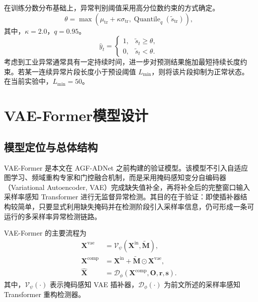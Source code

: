 \documentclass[bachelor, vlined]{DissertUESTC}
\begin{document}
    在训练分数分布基础上，异常判别阈值采用高分位数约束的方式确定。
    \begin{equation}
        \theta
        =
        \max
        \left(
            \mu_{\mathrm{tr}} + \kappa \sigma_{\mathrm{tr}},
            \operatorname{Quantile}_{q}(\tilde{s}_{\mathrm{tr}})
        \right),
    \end{equation}
    其中，$\kappa=2.0$，$q=0.95$。
    \begin{equation}
        \hat{y}_t =
        \begin{cases}
            1, & \tilde{s}_t \geq \theta, \\
            0, & \tilde{s}_t < \theta.
        \end{cases}
    \end{equation}
    考虑到工业异常通常具有一定持续时间，进一步对预测结果施加最短持续长度约束。若某一连续异常片段长度小于预设阈值 $L_{\min}$，则将该片段抑制为正常状态。在当前实验中，$L_{\min}=50$。

    \section{VAE-Former模型设计}

    \subsection{模型定位与总体结构}

    VAE-Former 是本文在 AGF-ADNet 之前构建的验证模型。该模型不引入自适应图学习、频域重构专家和门控融合机制，而是采用掩码感知变分自编码器（Variational Autoencoder, VAE）完成缺失值补全，再将补全后的完整窗口输入采样率感知 Transformer 进行无监督异常检测。其目的在于验证：即使插补器结构较简单，只要显式利用缺失掩码并在检测阶段引入采样率信息，仍可形成一条可运行的多采样率异常检测链路。

    VAE-Former 的主要流程为
    \begin{align}
        \mathbf{X}^{\mathrm{vae}} &= \mathcal{V}_{\psi}\!\left(\mathbf{X}^{\mathrm{in}},\widetilde{\mathbf{M}}\right), \\
        \mathbf{X}^{\mathrm{comp}} &= \mathbf{X}^{\mathrm{in}} + \widetilde{\mathbf{M}} \odot \mathbf{X}^{\mathrm{vae}}, \\
        \hat{\mathbf{X}} &= \mathcal{D}_{\phi}\!\left(\mathbf{X}^{\mathrm{comp}},\mathbf{O},\mathbf{r},\mathbf{s}\right).
    \end{align}
    其中，$\mathcal{V}_{\psi}(\cdot)$ 表示掩码感知 VAE 插补器，$\mathcal{D}_{\phi}(\cdot)$ 为前文所述的采样率感知 Transformer 重构检测器。
\end{document}
